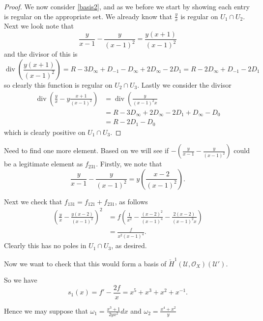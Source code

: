 \documentclass[draft, 11pt]{article} %
\theoremstyle{plain}
\theoremstyle{remark}
\newcommand{\cU}{{\mathcal U}}
\newcommand{\cechhone}{\check{H}^1(\mathcal U,\mathcal O_X)}
\DeclareMathOperator{\di}{div}
\begin{document}
\begin{proof}
We now consider \eqref{basis2}, and as we before we start by showing each entry is regular on the appropriate set.
We already know that $\frac{y}{x}$ is regular on $U_1 \cap U_2$.
Next we look note that
\[
\frac{y}{x-1} - \frac{y}{(x-1)^2} = \frac{y(x+1)}{(x-1)^2}
\]
and the divisor of this is
\[
\di\left( \frac{y(x+1)}{(x-1)^2} \right)  = R - 3D_\infty + D_{-1} - D_\infty + 2D_\infty - 2D_1 = R - 2D_\infty + D_{-1} - 2D_1
\]
so clearly this function is regular on $U_2 \cap U_3$.
Lastly we consider the divisor
\begin{align}
\di\left( \frac{y}{x} - y\frac{x+1}{(x-1)^2} \right) & = \di \left( \frac{y}{(x-1)^2x} \\
& = R - 3D_\infty + 2D_\infty - 2D_1 + D_\infty - D_0 \\
& = R -2D_1 -D_0
\end{align}
which is clearly positive on $U_1 \cap U_3$.


\end{proof}

Need to find one more element. Based on \cite{canonicalrepresentation} we will see if $-\left(\frac{y}{x-1} - \frac{y}{(x-1)^2}\right)$ could be a legitimate element as $f_{231}$.
Firstly, we note that
\begin{equation*}
\frac{y}{x-1} - \frac{y}{(x-1)^2} = y \left( \frac{x-2}{(x-1)^2} \right).
\end{equation*}

Next we check that $f_{131} = f_{121} + f_{231}$, as follows 
\begin{align*}
\left( \frac{y}{x} - \frac{y(x-2)}{(x-1)^2} \right)^2 & = f \left( \frac{1}{x^2} - \frac{(x-2)^2}{(x-1)^4} - \frac{2(x-2)}{(x-1)^2x} \right) \\
& = \frac{f}{x^2(x-1)^4}.
\end{align*}
Clearly this has no poles in $U_1 \cap U_3$, as desired.

Now we want to check that this would form a basis of $\cechhone (\cU ')$.

So we have
\[
s_1(x) = f'-\frac{2f}{x}  = x^5 + x^3 + x^2 + x^{-1}.
\]

Hence we may suppose that $\omega_1 = \frac{x^3+1}{2yx^2}dx$ and $\omega_2 = \frac{x^4+x^2}{y}$
\end{document}
